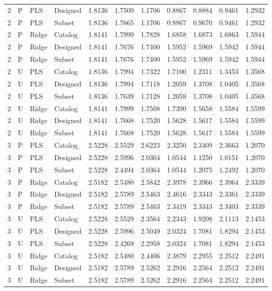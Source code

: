 \documentclass[10pt,a4paper]{article}
\begin{document}
\begin{landscape}
\begin{longtable}{rlllrrrrrrr}
2 & P & PLS & Designed & 1.8136 & 1.7509 & 1.1706 & 0.8867 & 0.8884 & 0.9461 & 1.2932 \\
2 & P & PLS & Subset & 1.8136 & 1.7665 & 1.1706 & 0.8867 & 0.9670 & 0.9461 & 1.2932 \\
2 & P & Ridge & Catalog & 1.8141 & 1.7999 & 1.7828 & 1.6858 & 1.6873 & 1.6863 & 1.5944 \\
2 & P & Ridge & Designed & 1.8141 & 1.7676 & 1.7400 & 1.5952 & 1.5969 & 1.5942 & 1.5944 \\
2 & P & Ridge & Subset & 1.8141 & 1.7676 & 1.7400 & 1.5952 & 1.5969 & 1.5942 & 1.5944 \\
2 & U & PLS & Catalog & 1.8136 & 1.7994 & 1.7322 & 1.7100 & 1.2311 & 1.3453 & 1.3568 \\
2 & U & PLS & Designed & 1.8136 & 1.7994 & 1.7118 & 1.2059 & 1.3708 & 1.0405 & 1.3568 \\
2 & U & PLS & Subset & 1.8136 & 1.7639 & 1.7128 & 1.2059 & 1.3708 & 1.0405 & 1.3568 \\
2 & U & Ridge & Catalog & 1.8141 & 1.7999 & 1.7508 & 1.7390 & 1.5658 & 1.5584 & 1.5599 \\
2 & U & Ridge & Designed & 1.8141 & 1.7668 & 1.7520 & 1.5628 & 1.5617 & 1.5584 & 1.5599 \\
2 & U & Ridge & Subset & 1.8141 & 1.7668 & 1.7520 & 1.5628 & 1.5617 & 1.5584 & 1.5599 \\
3 & P & PLS & Catalog & 2.5228 & 2.5529 & 2.6223 & 2.3250 & 2.3409 & 2.3663 & 1.2070 \\
3 & P & PLS & Designed & 2.5228 & 2.5996 & 2.0364 & 1.0544 & 1.1250 & 1.0151 & 1.2070 \\
3 & P & PLS & Subset & 2.5228 & 2.4494 & 2.0364 & 1.0544 & 1.2075 & 1.2492 & 1.2070 \\
3 & P & Ridge & Catalog & 2.5182 & 2.5480 & 2.5842 & 2.3978 & 2.3966 & 2.3964 & 2.3339 \\
3 & P & Ridge & Designed & 2.5182 & 2.5789 & 2.5463 & 2.4616 & 2.3343 & 2.3361 & 2.3339 \\
3 & P & Ridge & Subset & 2.5182 & 2.5789 & 2.5463 & 2.3419 & 2.3343 & 2.3403 & 2.3339 \\
3 & U & PLS & Catalog & 2.5228 & 2.5529 & 2.3564 & 2.2343 & 1.9208 & 2.1113 & 2.1453 \\
3 & U & PLS & Designed & 2.5228 & 2.5996 & 2.5049 & 2.0324 & 1.7081 & 1.8294 & 2.1453 \\
3 & U & PLS & Subset & 2.5228 & 2.4269 & 2.2958 & 2.0324 & 1.7081 & 1.8294 & 2.1453 \\
3 & U & Ridge & Catalog & 2.5182 & 2.5480 & 2.4406 & 2.3879 & 2.2955 & 2.2512 & 2.2491 \\
3 & U & Ridge & Designed & 2.5182 & 2.5789 & 2.5262 & 2.2916 & 2.2564 & 2.2512 & 2.2491 \\
3 & U & Ridge & Subset & 2.5182 & 2.5789 & 2.5262 & 2.2916 & 2.2564 & 2.2512 & 2.2491 \\
\end{longtable}
\endgroup
\end{landscape}
\end{document}
